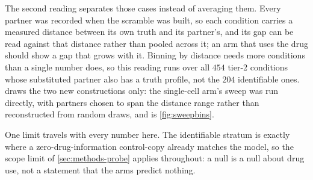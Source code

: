 The second reading separates those cases instead of averaging them. Every partner
was recorded when the scramble was built, so each condition carries a measured
distance between its own truth and its partner's, and its gap can be read against
that distance rather than pooled across it; an arm that uses the drug should show
a gap that grows with it. Binning by distance needs more conditions than a single
number does, so this reading runs over all $\num{454}$ tier-2 conditions whose
substituted partner also has a truth profile, not the $\num{204}$ identifiable
ones.  draws the two new constructions only: the single-cell
arm's sweep was run directly, with partners chosen to span the distance range
rather than reconstructed from random draws, and is \cref{fig:sweepbins}.

One limit travels with every number here. The identifiable stratum is exactly
where a zero-drug-information control-copy already matches the model, so the
scope limit of \cref{sec:methods-probe} applies throughout: a null is a null
about drug use, not a statement that the arms predict nothing.

